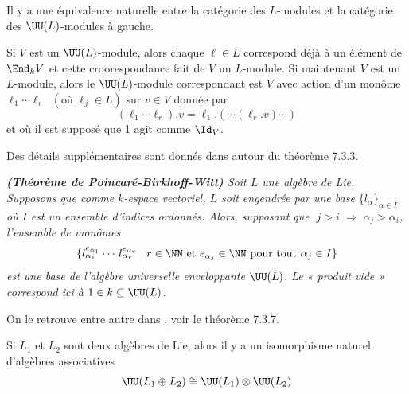 \begin{Thm} \label{equivalenceU} Il y a une équivalence naturelle entre la catégorie des $L$-modules et la catégorie des $\UU(L)$-modules à gauche. 

Si $V$ est un $\UU(L)$-module, alors chaque $\ell \in L$ correspond déjà à un élément de $\End_k V$ et cette croorespondance fait de $V$ un $L$-module. Si maintenant $V$ est un $L$-module, alors le $\UU(L)$-module correspondant est $V$ avec action d'un monôme $\ell_1\cdots \ell_r \;\; (\text{où } \ell_j \in L)$ sur $v \in V$ donnée par
$$ (\ell_1\cdots \ell_r).v = \ell_1.(\cdots(\ell_r.v)\cdots) $$
et où il est supposé que 1 agit comme $\Id_V$.
\end{Thm}
Des détails supplémentaires sont donnés dans \cite{Weibel} autour du théorème 7.3.3.

\begin{Thm} \em \textbf{(Théorème de Poincaré-Birkhoff-Witt)} \em Soit $L$ une algèbre de Lie. Supposons que comme $k$-espace vectoriel, $L$ soit engendrée par une base $\{l_\alpha\}_{\alpha \in I}$ où $I$ est un ensemble d'indices ordonnés. 
Alors, supposant que $\; j > i \; \Rightarrow \; \alpha_j > \alpha_i$, l'ensemble de monômes
$$ \{l_{\alpha_1}^{e_{\alpha_1}} \cdots \, l_{\alpha_r}^{e_{\alpha_r}} \; | \; r \in \NN \text{ et } e_{\alpha_j} \in \NN \text{ pour tout } \alpha_j \in I \} $$
est une base de l'algèbre universelle enveloppante $\UU(L)$. Le « produit vide » correspond ici à $1 \in k \subseteq \UU(L)$.
\end{Thm}
On le retrouve entre autre dans \cite{Weibel}, voir le théorème 7.3.7.


\begin{Cor} Si $L_1$ et $L_2$ sont deux algèbres de Lie, alors il y a un isomorphisme naturel d'algèbres associatives
$$ \UU(L_1 \oplus L_2) \cong \UU(L_1) \otimes \UU(L_2) $$
\end{Cor}

